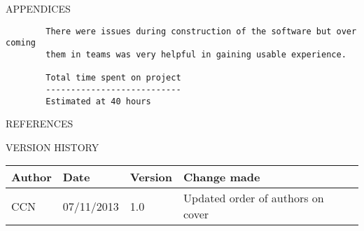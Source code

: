 \documentclass{article}
\newcommand{\versionhistory}{
		\begin{tabularx}{\linewidth}{| p{2cm} | p{2cm} | p{2cm} | X | }
			\hline
			\bf{Author} & \bf{Date} & \bf{Version} & \bf{Change made} \\
			\hline
			CCN & 07/11/2013 & 1.0 & Updated order of authors on cover \\
			\hline
		\end{tabularx}
}
\begin{document}
\begin{section}{APPENDICES}
\begin{verbatim}
		There were issues during construction of the software but over coming 
		them in teams was very helpful in gaining usable experience.
		
		Total time spent on project
		---------------------------
		Estimated at 40 hours
		\end{verbatim}
		
		
		
		
		
	
		
		
		
	\end{section}

	\nocite{LaTeXTemplate} %

	\newpage
	\begin{section}{REFERENCES}
		
		
	\end{section}
	
	\vspace{1cm}
	\begin{section}{VERSION HISTORY}
		\versionhistory
	\end{section}
\end{document}
